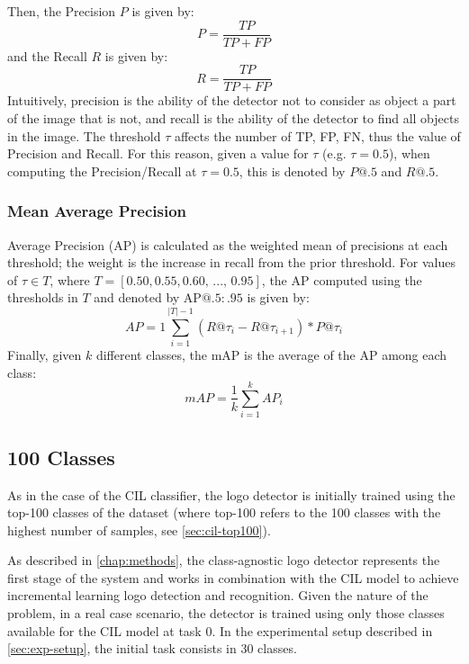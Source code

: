 Then, the Precision $P$ is given by:
\begin{equation} %
    P = \frac{TP}{TP + FP}
\end{equation}
and the Recall $R$ is given by:
\begin{equation} %
    R = \frac{TP}{TP + FP}
\end{equation}
Intuitively, precision is the ability of the detector not to consider as object a part of the image that is not, and recall is the ability of the detector to find all objects in the image.
The threshold $\tau$ affects the number of TP, FP, FN, thus the value of Precision and Recall. For this reason, given a value for $\tau$ (e.g. $\tau = 0.5$), when computing the Precision/Recall at $\tau = 0.5$, this is denoted by $P@.5$ and $R@.5$.

\subsubsection{Mean Average Precision}
Average Precision (AP) is calculated as the weighted mean of precisions at each threshold; the weight is the increase in recall from the prior threshold. For values of $\tau \in T$, where $T = [0.50, 0.55, 0.60,\, ..., \, 0.95 ]$, the AP computed using the thresholds in $T$ and denoted by $\text{AP}@.5:.95$ is given by:
\begin{equation}
    AP = 1 \sum_{i=1}^{|T| - 1}(R@\tau_i - R@\tau_{i+1} ) * P@\tau_{i}
\end{equation}
Finally, given $k$ different classes, the mAP is the average of the AP among each class:
\begin{equation}
    mAP = \frac{1}{k} \sum_{i=1}^{k} AP_i
\end{equation}

\subsection{100 Classes}
As in the case of the CIL classifier, the logo detector is initially trained using the top-100 classes of the dataset (where top-100 refers to the 100 classes with the highest number of samples, see \autoref{sec:cil-top100}).

As described in \autoref{chap:methods}, the class-agnostic logo detector represents the first stage of the system and works in combination with the CIL model to achieve incremental learning logo detection and recognition. Given the nature of the problem, in a real case scenario, the detector is trained using only those classes available for the CIL model at task 0. In the experimental setup described in \autoref{sec:exp-setup}, the initial task consists in 30 classes.

